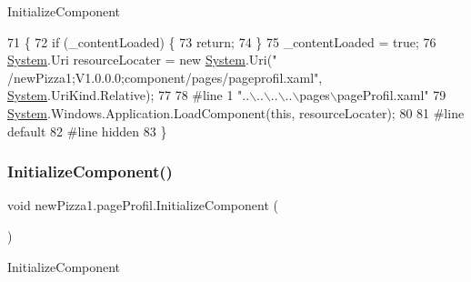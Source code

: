 Initialize\+Component 


\begin{DoxyCode}
71                                           \{
72             \textcolor{keywordflow}{if} (\_contentLoaded) \{
73                 \textcolor{keywordflow}{return};
74             \}
75             \_contentLoaded = \textcolor{keyword}{true};
76             \hyperlink{namespaceSystem}{System}.Uri resourceLocater = \textcolor{keyword}{new} \hyperlink{namespaceSystem}{System}.Uri(\textcolor{stringliteral}{"
      /newPizza1;V1.0.0.0;component/pages/pageprofil.xaml"}, \hyperlink{namespaceSystem}{System}.UriKind.Relative);
77             
78 \textcolor{preprocessor}{            #line 1 "..\(\backslash\)..\(\backslash\)..\(\backslash\)..\(\backslash\)pages\(\backslash\)pageProfil.xaml"}
79             \hyperlink{namespaceSystem}{System}.Windows.Application.LoadComponent(\textcolor{keyword}{this}, resourceLocater);
80             
81 \textcolor{preprocessor}{            #line default}
82 \textcolor{preprocessor}{            #line hidden}
83         \}
\end{DoxyCode}
\mbox{\label{classnewPizza1_1_1pageProfil_a53ca6e755a62dfda0434ae88b7355d3e}} 
\subsubsection{\texorpdfstring{Initialize\+Component()}{InitializeComponent()}\hspace{0.1cm}{\footnotesize\ttfamily [2/3]}}
{\footnotesize\ttfamily void new\+Pizza1.\+page\+Profil.\+Initialize\+Component (\begin{DoxyParamCaption}{ }\end{DoxyParamCaption})\hspace{0.3cm}{\ttfamily [inline]}}



Initialize\+Component 


